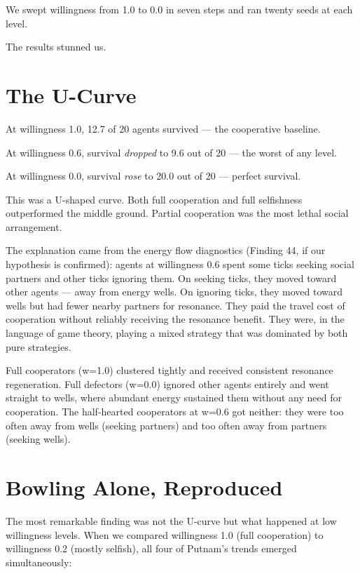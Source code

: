 We swept willingness from 1.0 to 0.0 in seven steps and ran twenty seeds at each level.

The results stunned us.

\section{The U-Curve}\label{the-u-curve}

At willingness 1.0, 12.7 of 20 agents survived --- the cooperative baseline.

At willingness 0.6, survival \emph{dropped} to 9.6 out of 20 --- the worst of any level.

At willingness 0.0, survival \emph{rose} to 20.0 out of 20 --- perfect survival.

This was a U-shaped curve. Both full cooperation and full selfishness outperformed the middle ground. Partial cooperation was the most lethal social arrangement.

The explanation came from the energy flow diagnostics (Finding 44, if our hypothesis is confirmed): agents at willingness 0.6 spent some ticks seeking social partners and other ticks ignoring them. On seeking ticks, they moved toward other agents --- away from energy wells. On ignoring ticks, they moved toward wells but had fewer nearby partners for resonance. They paid the travel cost of cooperation without reliably receiving the resonance benefit. They were, in the language of game theory, playing a mixed strategy that was dominated by both pure strategies.

Full cooperators (w=1.0) clustered tightly and received consistent resonance regeneration. Full defectors (w=0.0) ignored other agents entirely and went straight to wells, where abundant energy sustained them without any need for cooperation. The half-hearted cooperators at w=0.6 got neither: they were too often away from wells (seeking partners) and too often away from partners (seeking wells).

\section{Bowling Alone, Reproduced}\label{bowling-alone-reproduced}

The most remarkable finding was not the U-curve but what happened at low willingness levels. When we compared willingness 1.0 (full cooperation) to willingness 0.2 (mostly selfish), all four of Putnam's trends emerged simultaneously:

